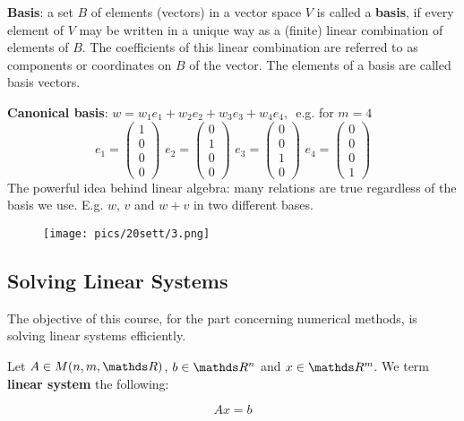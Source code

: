 \documentclass[ComputationalMathematics.tex]{subfiles}
\begin{document}
\begin{definition}
  \textbf{Basis}: a set $B$ of elements (vectors) in a vector space $V$ is called a \textbf{basis}, if every element of $V$ may be written in a unique way as a (finite) linear combination of elements of $B$. The coefficients of this linear combination are referred to as components or coordinates on $B$ of the vector. The elements of a basis are called basis vectors.
\end{definition}
\noindent\textbf{Canonical basis}: $w = w_1e_1 + w_2e_2 + w_3e_3 + w_4e_4, \,$ e.g. for $m = 4$\\
$$  e_1 = \begin{pmatrix} 1\\ 0\\ 0\\ 0 \end{pmatrix}\, \,
    e_2 = \begin{pmatrix} 0\\ 1\\ 0\\ 0 \end{pmatrix}\, \,
    e_3 = \begin{pmatrix} 0\\ 0\\ 1\\ 0 \end{pmatrix}\, \,
    e_4 = \begin{pmatrix} 0\\ 0\\ 0\\ 1 \end{pmatrix}$$
The powerful idea behind linear algebra: many relations are true
regardless of the basis we use. E.g. $w$, $v$ and $w + v$ in two different bases.
\begin{figure}[H]
    \centering
    \texttt{[image: pics/20sett/3.png]}
    \label{fig:20sett1}
\end{figure}

\subsection{Solving Linear Systems}
The objective of this course, for the part concerning numerical methods, is solving linear systems efficiently.

\begin{definition}
  Let $A \in M(n, m, \R)$, $b \in \R^n$ and $x \in \R^m$. We term \textbf{linear system} the following:

  \[
Ax = b
  \]
\end{definition}
\end{document}
